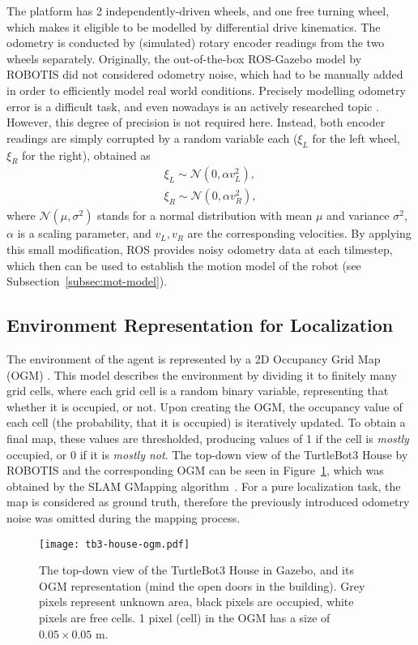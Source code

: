 The platform has 2 independently-driven wheels, and one free turning wheel, which
makes it eligible to be modelled by differential drive kinematics.
The odometry is conducted by (simulated) rotary encoder readings from the two wheels separately.
Originally, the out-of-the-box ROS-Gazebo model by ROBOTIS did not considered odometry noise,
which had to be manually added in order to efficiently model real world conditions.
Precisely modelling odometry error is a difficult task, and even nowadays is an actively researched topic \cite{Fazekas2021}.
However, this degree of precision is not required here.
Instead, both encoder readings are simply corrupted by a random variable each  ($\xi_L$ for the left wheel, $\xi_R$ for the right), obtained as
\begin{align}
    \xi_L \sim \mathcal{N}(0,\alpha v_L^{2}), \\
    \xi_R \sim \mathcal{N}(0,\alpha v_R^{2}),
\end{align}
where $\mathcal{N}(\mu,\sigma^{2})$ stands for a normal distribution with mean $\mu$ and variance $\sigma^{2}$,
$\alpha$ is a scaling parameter, and $v_L, v_R$ are the corresponding velocities. By applying this small modification,
ROS provides noisy odometry data at each tilmestep, which then can be used to establish the motion model of the robot (see Subsection~\ref{subsec:mot-model}).

\subsection{Environment Representation for Localization}
The environment of the agent is represented by a 2D Occupancy Grid Map (OGM) \cite{Moravec1985}.
This model describes the environment by dividing it to finitely many grid cells, where each grid cell is a random binary variable,
representing that whether it is occupied, or not.
Upon creating the OGM, the occupancy value of each cell (the probability, that it is occupied) is iteratively updated.
To obtain a final map, these values are thresholded, producing values of 1 if the cell is \emph{mostly} occupied,
or 0 if it is \emph{mostly not}.
The top-down view of the TurtleBot3 House by ROBOTIS and the corresponding OGM can be seen in Figure~\ref{fig:tb3-house-ogm},
which was obtained by the SLAM GMapping algorithm~\cite{Grisetti2007}.
For a pure localization task, the map is considered as ground truth,
therefore the previously introduced odometry noise was omitted during the mapping process.
\begin{figure}[htbp]
    \centering
    \texttt{[image: tb3-house-ogm.pdf]}
    \caption{The top-down view of the TurtleBot3 House in Gazebo, and its OGM representation (mind the open doors in the building).
        Grey pixels represent unknown area, black pixels are occupied, white pixels are free cells.
        1 pixel (cell) in the OGM has a size of $0.05 \times 0.05$ m. }
    \label{fig:tb3-house-ogm}
\end{figure}
